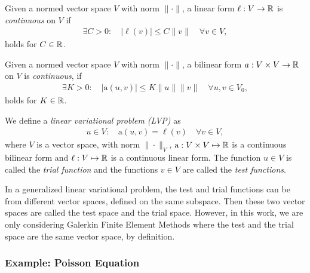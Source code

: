 \begin{definition}
    \label{def:cont_linear_form}
    Given a normed vector space $V$ with norm $\|\cdot\|$, a linear form $\ell: V \to \mathbb{R}$
    is \emph{continuous} on $V$ if \cite[Def~1.2.3.42]{hiptmair_numerical_2023}
    \begin{align}
        \exists C > 0: \quad |\ell(v)| \leq C\|v\| \quad \forall v \in V,
    \end{align}
    holds for $C \in \mathbb{R}$.
\end{definition}
\begin{definition}
    \label{def:cont_bilinear_form}
    Given a normed vector space $V$ with norm $\|\cdot\|$,
    a bilinear form $a: V \times V \to \mathbb{R}$ on $V$ is \emph{continuous}, if
    \cite[Def~1.2.3.42]{hiptmair_numerical_2023}
    \begin{align}
        \exists K > 0: \quad |\mathrm{a}(u, v)| \leq K\|u\| \|v\| \quad \forall u,v \in V_0,
    \end{align}
    holds for $K \in \mathbb{R}$.
\end{definition}

\begin{definition}
    \label{def:lin_var_prob}
    We define a \emph{linear variational problem (LVP)} as
    \cite[Def.~1.4.1.7]{hiptmair_numerical_2023}
    \begin{align}
        u \in V: \quad \mathrm{a}(u, v) = \ell(v) \quad \forall v \in V, \label{eq:lin_var_prob}
    \end{align}
    where $V$ is a vector space, with norm $\|\cdot\|_V$,
    $\mathrm{a}: V \times V \mapsto \mathbb{R}$ is a continuous bilinear form and
    $\ell: V \mapsto \mathbb{R}$ is a continuous linear form.
    The function $u \in V$ is called the \emph{trial function} and the functions $v \in V$ are called the \emph{test functions}.

    In a generalized linear variational problem, the test and trial functions can be from different vector spaces, defined on the same subspace.
    Then these two vector spaces are called the test space and the trial space. However, in this work, we are only considering
    Galerkin Finite Element Methods where the test and the trial space are the same vector space, by definition.
\end{definition}

\subsubsection{Example: Poisson Equation}
\label{sec:poisson_eq}

